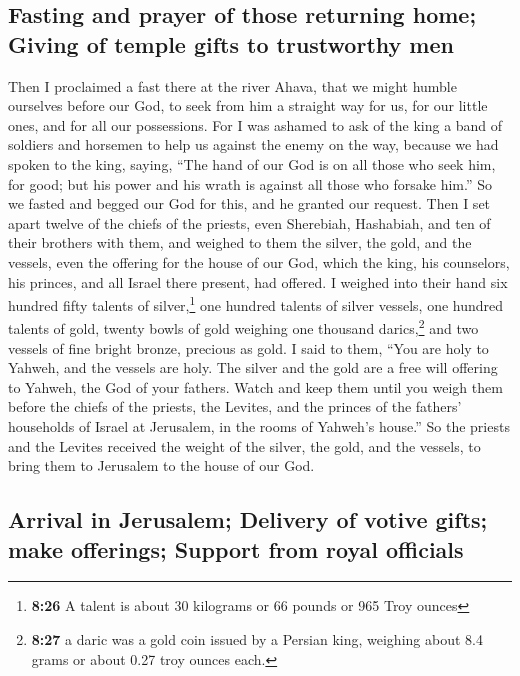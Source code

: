 \hypertarget{fasting-and-prayer-of-those-returning-home-giving-of-temple-gifts-to-trustworthy-men}{%
\subsection{Fasting and prayer of those returning home; Giving of temple
gifts to trustworthy
men}\label{fasting-and-prayer-of-those-returning-home-giving-of-temple-gifts-to-trustworthy-men}}

 Then I proclaimed a fast there at the river Ahava, that
we might humble ourselves before our God, to seek from him a straight
way for us, for our little ones, and for all our possessions.
 For I was ashamed to ask of the king a band of soldiers
and horsemen to help us against the enemy on the way, because we had
spoken to the king, saying, ``The hand of our God is on all those who
seek him, for good; but his power and his wrath is against all those who
forsake him.''  So we fasted and begged our God for this,
and he granted our request.  Then I set apart twelve of
the chiefs of the priests, even Sherebiah, Hashabiah, and ten of their
brothers with them,  and weighed to them the silver, the
gold, and the vessels, even the offering for the house of our God, which
the king, his counselors, his princes, and all Israel there present, had
offered.  I weighed into their hand six hundred fifty
talents of silver,\footnote{\textbf{8:26} A talent is about 30 kilograms
  or 66 pounds or 965 Troy ounces} one hundred talents of silver
vessels, one hundred talents of gold,  twenty bowls of
gold weighing one thousand darics,\footnote{\textbf{8:27} a daric was a
  gold coin issued by a Persian king, weighing about 8.4 grams or about
  0.27 troy ounces each.} and two vessels of fine bright bronze,
precious as gold.  I said to them, ``You are holy to
Yahweh, and the vessels are holy. The silver and the gold are a free
will offering to Yahweh, the God of your fathers.  Watch
and keep them until you weigh them before the chiefs of the priests, the
Levites, and the princes of the fathers' households of Israel at
Jerusalem, in the rooms of Yahweh's house.''  So the
priests and the Levites received the weight of the silver, the gold, and
the vessels, to bring them to Jerusalem to the house of our God.

\hypertarget{arrival-in-jerusalem-delivery-of-votive-gifts-make-offerings-support-from-royal-officials}{%
\subsection{Arrival in Jerusalem; Delivery of votive gifts; make
offerings; Support from royal
officials}\label{arrival-in-jerusalem-delivery-of-votive-gifts-make-offerings-support-from-royal-officials}}

